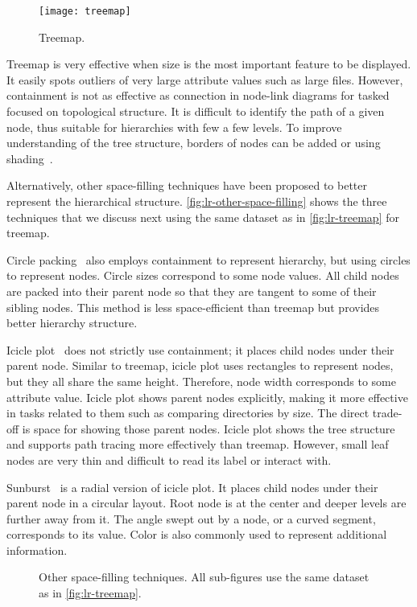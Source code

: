 \begin{figure}[!htb]
	\centering
	\texttt{[image: treemap]}
	\caption{Treemap.}
	\label{fig:lr-treemap}
\end{figure}

Treemap is very effective when size is the most important feature to be displayed. It easily spots outliers of very large attribute values such as large files. However, containment is not as effective as connection in node-link diagrams for tasked focused on topological structure. It is difficult to identify the path of a given node, thus suitable for hierarchies with few a few levels. To improve understanding of the tree structure, borders of nodes can be added or using shading~\cite{Wijk1999}.

Alternatively, other space-filling techniques have been proposed to better represent the hierarchical structure. \autoref{fig:lr-other-space-filling} shows the three techniques that we discuss next using the same dataset as in \autoref{fig:lr-treemap} for treemap. 

Circle packing~\cite{Wang2006} also employs containment to represent hierarchy, but using circles to represent nodes. Circle sizes correspond to some node values. All child nodes are packed into their parent node so that they are tangent to some of their sibling nodes. This method is less space-efficient than treemap but provides better hierarchy structure.

Icicle plot~\cite{Kruskal1983} does not strictly use containment; it places child nodes under their parent node. Similar to treemap, icicle plot uses rectangles to represent nodes, but they all share the same height. Therefore, node width corresponds to some attribute value. Icicle plot shows parent nodes explicitly, making it more effective in tasks related to them such as comparing directories by size. The direct trade-off is space for showing those parent nodes. Icicle plot shows the tree structure and supports path tracing more effectively than treemap. However, small leaf nodes are very thin and difficult to read its label or interact with.

Sunburst~\cite{Zhang2000} is a radial version of icicle plot. It places child nodes under their parent node in a circular layout. Root node is at the center and deeper levels are further away from it. The angle swept out by a node, or a curved segment, corresponds to its value. Color is also commonly used to represent additional information.

\begin{figure}[!htb]
\centering
{}

\vspace{.5\baselineskip}

\hfill
{}
\caption{Other space-filling techniques. All sub-figures use the same dataset as in \autoref{fig:lr-treemap}.}
\label{fig:lr-other-space-filling}
\end{figure}


